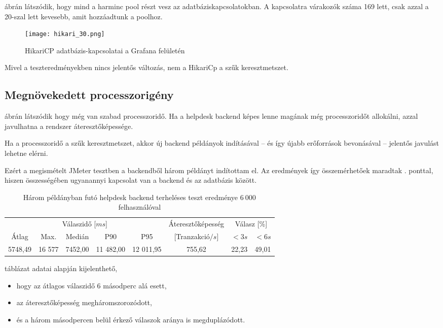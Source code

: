  ábrán látszódik, hogy mind a harminc pool részt vesz az adatbáziskapcsolatokban. A kapcsolatra várakozók száma 169 lett, csak azzal a 20-szal lett kevesebb, amit hozzáadtunk a poolhoz.


\begin{figure}[hbt] 
	\centering
	\texttt{[image: hikari\_30.png]}
	\caption{HikariCP adatbázis-kapcsolatai a Grafana felületén}
	\label{fig:hikari_30}
\end{figure}

Mivel a teszteredményekben nincs jelentős változás, nem a HikariCp a szűk keresztmetszet.

\pagebreak
\subsection{Megnövekedett processzorigény}
 ábrán látszódik hogy még van szabad processzoridő. Ha a helpdesk backend  képes lenne magának még processzoridőt allokálni, azzal javulhatna a rendszer áteresztőképessége. 

Ha a processzoridő a szűk keresztmetszet, akkor új backend példányok indításával --  és így újabb erőforrások bevonásával --   jelentős javulást lehetne elérni.

Ezért a megismételt JMeter tesztben a backendből három példányt indítottam el. Az eredmények így összemérhetőek maradtak . ponttal, hiszen összességében ugyanannyi kapcsolat van a backend és az adatbázis között.


\begin{table}[hbt]
	
		\begin{tabular}{ccccc|c|cc}
			\multicolumn{5}{c|}{Válaszidő [$ms$]}  & Áteresztőképesség & \multicolumn{2}{c}{Válasz [\%]}	\\
			Átlag & Max. & Medián & P90 & P95 &	[Tranzakció$/s$] & $<3s$& $<6s$ \\
			\hline 
			5748,49 & 16 577 & 7452,00 & 11 482,00 & 12 011,95 & 755,62 & 22,23 & 49,01 \\
		\end{tabular} 
	
	\caption{Három példányban futó helpdesk backend terheléses teszt eredménye $6~000$ felhasználóval}
	\label{tabl:3_instance}
\end{table}


 táblázat adatai alapján kijelenthető,
\begin{itemize}
	\item hogy az átlagos válaszidő 6 másodperc alá esett,
	\item az áteresztőképesség megháromszorozódott,
	\item és a három másodpercen belül érkező válaszok aránya is megduplázódott.
\end{itemize}


